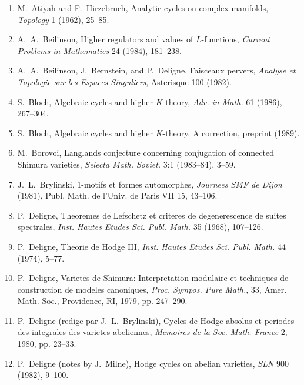 \documentclass[11pt,a4paper]{article}
\theoremstyle{plain}
\theoremstyle{definition}
\begin{document}
\begin{enumerate}
\item[{[1]}] M.~Atiyah and F.~Hirzebruch, Analytic cycles on complex manifolds, \textit{Topology} 1 (1962), 25--85.

\item[{[2]}] A.~A.~Beilinson, Higher regulators and values of $L$-functions, \textit{Current Problems in Mathematics} 24 (1984), 181--238.

\item[{[3]}] A.~A.~Beilinson, J.~Bernstein, and P.~Deligne, Faisceaux pervers, \textit{Analyse et Topologie sur les Espaces Singuliers}, Asterisque 100 (1982).

\item[{[4]}] S.~Bloch, Algebraic cycles and higher $K$-theory, \textit{Adv. in Math.} 61 (1986), 267--304.

\item[{[5]}] S.~Bloch, Algebraic cycles and higher $K$-theory, A correction, preprint (1989).

\item[{[6]}] M.~Borovoi, Langlands conjecture concerning conjugation of connected Shimura varieties, \textit{Selecta Math. Soviet.} 3:1 (1983--84), 3--59.

\item[{[7]}] J.~L.~Brylinski, 1-motifs et formes automorphes, \textit{Journees SMF de Dijon} (1981), Publ. Math. de l'Univ. de Paris VII 15, 43--106.

\item[{[8]}] P.~Deligne, Theoremes de Lefschetz et criteres de degenerescence de suites spectrales, \textit{Inst. Hautes Etudes Sci. Publ. Math.} 35 (1968), 107--126.

\item[{[9]}] P.~Deligne, Theorie de Hodge III, \textit{Inst. Hautes Etudes Sci. Publ. Math.} 44 (1974), 5--77.

\item[{[10]}] P.~Deligne, Varietes de Shimura: Interpretation modulaire et techniques de construction de modeles canoniques, \textit{Proc. Sympos. Pure Math.}, 33, Amer. Math. Soc., Providence, RI, 1979, pp. 247--290.

\item[{[11]}] P.~Deligne (redige par J.~L.~Brylinski), Cycles de Hodge absolus et periodes des integrales des varietes abeliennes, \textit{Memoires de la Soc. Math. France} 2, 1980, pp. 23--33.

\item[{[12]}] P.~Deligne (notes by J.~Milne), Hodge cycles on abelian varieties, \textit{SLN} 900 (1982), 9--100.


\end{enumerate}
\end{document}

